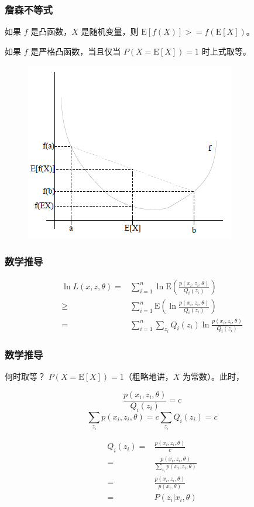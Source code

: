 \documentclass{beamer}
\def\E{\mathrm{E}}
\newcommand{\Gh}{\theta}
\begin{document}
\begin{frame}
    \frametitle{詹森不等式}

    如果 $f$ 是凸函数，$X$ 是随机变量，则 $\E[f(X)]>=f(\E[X])$。

    如果 $f$ 是严格凸函数，当且仅当 $P(X = \E[X]) = 1$ 时上式取等。
    
    \begin{figure}
        \centering
        \includegraphics[width=.5\textwidth]{res/jensen.png}
    \end{figure}

\end{frame}

\begin{frame}
    \frametitle{数学推导}

    \[\begin{split}
        \ln L(x, z, \Gh) = & \sum_{i = 1}^{n}\ln \E(\frac{p(x_i, z_i, \Gh)}{Q_i(z_i)}) \\
        \geq & \sum_{i = 1}^{n} \E(\ln \frac{p(x_i, z_i, \Gh)}{Q_i(z_i)}) \\
        = & \sum_{i = 1}^{n}\sum_{z_i} Q_i(z_i) \ln \frac{p(x_i, z_i, \Gh)}{Q_i(z_i)}
    \end{split}\]

\end{frame}

\begin{frame}
    \frametitle{数学推导}
    
    何时取等？ $P(X = \E[X]) = 1$（粗略地讲，$X$ 为常数）。此时，

    \[\frac{p(x_i, z_i, \Gh)}{Q_i(z_i)} = c\]
    \[\sum_{z_i} p(x_i, z_i, \Gh) = c \sum_{z_i} Q_i(z_i) = c\]

    \[\begin{split}
        Q_i(z_i) = & \frac{p(x_i, z_i, \Gh)}{c} \\
        = & \frac{p(x_i, z_i, \Gh)}{\sum_{z_i} p(x_i, z_i, \Gh)} \\
        = & \frac{p(x_i, z_i, \Gh)}{p(x_i, \Gh)} \\
        = & P(z_i \vert x_i, \Gh)
    \end{split}\]

\end{frame}
\end{document}
